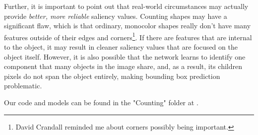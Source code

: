 Further, it is important to point out that real-world circumstances may actually provide
\textit{better, more reliable} saliency values. Counting shapes may have a significant flaw, which
is that ordinary, monocolor shapes really don't have many features outside of their edges and
corners\footnote{David Crandall reminded me about corners possibly being important.}. If there are
features that are internal to the object, it may result in cleaner saliency values that are focused
on the object itself. However, it is also possible that the network learns to identify one component
that many objects in the image share, and, as a result, its children pixels do not span the object
entirely, making bounding box prediction problematic.

Our code and models can be found in the "Counting" folder at \cite{mycode}.
